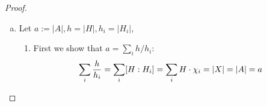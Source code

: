 \documentclass[a4paper]{article}
\begin{document}
\begin{prop} [Proposition 25]
\begin{proof}
\begin{enumerate}[(a)]
\begin{enumerate}[(i)]
\begin{enumerate}[1.]
\begin{align}
                          &= \frac {|A|\dim W}{|G_{i}|} \sum_{h \in H} h\chi_{i}(a)
                        \end{align}
                        This means that $\theta_{i,\rho}|_{A}$ is a direct sum of irred. representations corresponding to the $h\chi_{i}$ which are in the orbit $H \cd \chi_{i}$. Since orbits are disjoint we have $H\chi_{i} = H\chi_{i'} \imp i = i'$.
                \end{enumerate}
          \item $\theta_{i,\rho}$ determines $\rho$ up to isomorphism:
                \begin{itemize}
                  \item For fixed $i$ let $W_{i}:= \{x \in W \mid \theta_{i,\rho}(a)(x) = \chi_{i}(a)(x), \forall a \in A\}$, then $W_{i}$ is $H_{i}$-stable:
                  \item So we want to check that $\theta_{i,\rho}(s)(x) \in W_{i}, \forall s \in H_{i}$ which is by definition equivalent to $\theta_{i,\rho}(a)(\theta_{i,\rho}(s)(x)) = \chi_{i}(a)(\theta_{i,\rho}(s)(x)), \forall a \in A$:
                  \item Look at:
                        \begin{align}
                          \theta_{i,\rho}(a)(\theta_{i,\rho}(s)(x)) = \theta_{i,\rho}(as)(x) = \theta_{i,\rho}(ss^{-1}as)(x) \\
                          \theta_{i,\rho}(s)\theta_{i,\rho}(\ubr{s^{-1}as}_{\in A})(x) = \theta_{i,\rho}(s)s\chi_{i}(a)(x) \\
                          = \chi_{i}(a)(\theta_{i,\rho}(s)(x))
                        \end{align}
                        So $W_{i}$ is $H_{i}$-stable.
                        \item One can check, that $\theta_{i,\rho}|_{H_{i}} \cong \rho$ TODO: HOW TO CHECK THIS??
                \end{itemize}
        \end{enumerate}
  \item Let $a:= |A|, h = |H|, h_{i} = |H_{i}|$,
        \begin{enumerate}[1.]
          \item First we show that $a = \sum_{i} h/h_{i}$:
                \begin{align}
                  \sum_{i} \frac h{h_{i}} = \sum_{i}[H:H_{i}] = \sum_{i} H\cdot \chi_{i} = |X| = |A| = a
                \end{align}

\end{enumerate}
\end{enumerate}
\end{proof}
\end{prop}
\end{document}
